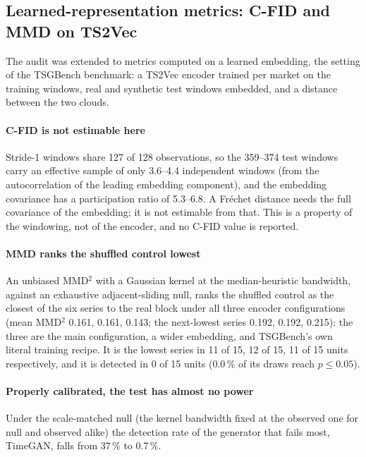 \documentclass[11pt,a4paper]{article}
\makeatletter
\DeclareRobustCommand{\_}{\ifmmode\nfss@text{\textunderscore}\else\textunderscore\allowbreak\fi}
\makeatother
\begin{document}
\subsection{Learned-representation metrics: C-FID and MMD on TS2Vec}
\label{sec:learned}
The audit was extended to metrics computed on a learned embedding, the setting of the TSGBench benchmark: a TS2Vec encoder trained per market on the training windows, real and synthetic test windows embedded, and a distance between the two clouds.

\paragraph{C-FID is not estimable here} Stride-1 windows share 127 of 128 observations, so the 359--374 test windows carry an effective sample of only 3.6--4.4 independent windows (from the autocorrelation of the leading embedding component), and the embedding covariance has a participation ratio of 5.3--6.8. A Fr\'echet distance needs the full covariance of the embedding; it is not estimable from that. This is a property of the windowing, not of the encoder, and no C-FID value is reported.

\paragraph{MMD ranks the shuffled control lowest} An unbiased MMD$^2$ with a Gaussian kernel at the median-heuristic bandwidth, against an exhaustive adjacent-sliding null, ranks the shuffled control as the closest of the six series to the real block under all three encoder configurations (mean MMD$^2$ 0.161, 0.161, 0.143; the next-lowest series 0.192, 0.192, 0.215): the three are the main configuration, a wider embedding, and TSGBench's own literal training recipe. It is the lowest series in 11 of 15, 12 of 15, 11 of 15 units respectively, and it is detected in 0 of 15 units (0.0\,\% of its draws reach $p\le0.05$).

\paragraph{Properly calibrated, the test has almost no power} Under the scale-matched null (the kernel bandwidth fixed at the observed one for null and observed alike) the detection rate of the generator that fails most, TimeGAN, falls from 37\,\% to 0.7\,\%.
\end{document}
